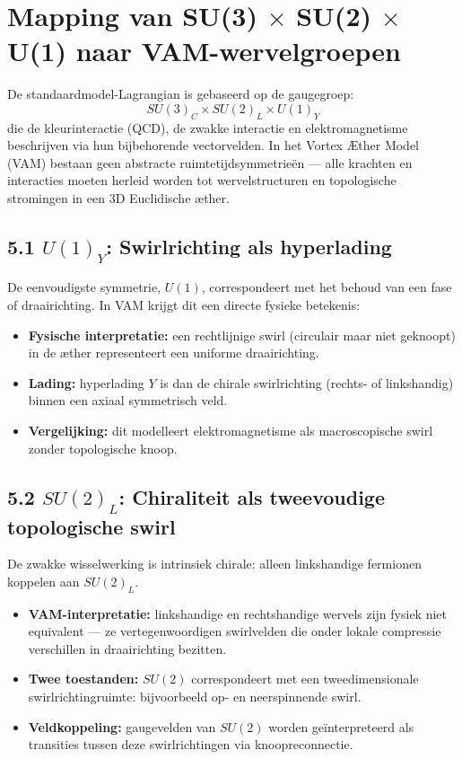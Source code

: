 \section{Mapping van SU(3) \texorpdfstring{$\times$}{x} SU(2) \texorpdfstring{$\times$}{x} U(1) naar VAM-wervelgroepen}

De standaardmodel-Lagrangian is gebaseerd op de gaugegroep:
\[
    SU(3)_C \times SU(2)_L \times U(1)_Y
\]
die de kleurinteractie (QCD), de zwakke interactie en elektromagnetisme beschrijven via hun bijbehorende vectorvelden. In het Vortex Æther Model (VAM) bestaan geen abstracte ruimtetijdsymmetrieën — alle krachten en interacties moeten herleid worden tot wervelstructuren en topologische stromingen in een 3D Euclidische æther.

\subsection*{5.1 $U(1)_Y$: Swirlrichting als hyperlading}
De eenvoudigste symmetrie, $U(1)$, correspondeert met het behoud van een fase of draairichting. In VAM krijgt dit een directe fysieke betekenis:
\begin{itemize}
    \item \textbf{Fysische interpretatie:} een rechtlijnige swirl (circulair maar niet geknoopt) in de æther representeert een uniforme draairichting.
    \item \textbf{Lading:} hyperlading $Y$ is dan de chirale swirlrichting (rechts- of linkshandig) binnen een axiaal symmetrisch veld.
    \item \textbf{Vergelijking:} dit modelleert elektromagnetisme als macroscopische swirl zonder topologische knoop.
\end{itemize}

\subsection*{5.2 $SU(2)_L$: Chiraliteit als tweevoudige topologische swirl}
De zwakke wisselwerking is intrinsiek chirale: alleen linkshandige fermionen koppelen aan $SU(2)_L$.
\begin{itemize}
    \item \textbf{VAM-interpretatie:} linkshandige en rechtshandige wervels zijn fysiek niet equivalent — ze vertegenwoordigen swirlvelden die onder lokale compressie verschillen in draairichting bezitten.
    \item \textbf{Twee toestanden:} $SU(2)$ correspondeert met een tweedimensionale swirlrichtingruimte: bijvoorbeeld op- en neerspinnende swirl.
    \item \textbf{Veldkoppeling:} gaugevelden van $SU(2)$ worden geïnterpreteerd als transities tussen deze swirlrichtingen via knoopreconnectie.
\end{itemize}

